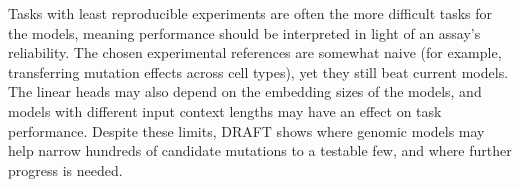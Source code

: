 Tasks with least reproducible experiments are often the more difficult tasks for the models, meaning performance should be interpreted in light of an assay's reliability. The chosen experimental references are somewhat naive (for example, transferring mutation effects across cell types), yet they still beat current models. The linear heads may also depend on the embedding sizes of the models, and models with different input context lengths may have an effect on task performance. Despite these limits, DRAFT shows where genomic models may help narrow hundreds of candidate mutations to a testable few, and where further progress is needed.
















